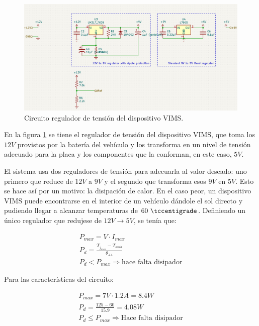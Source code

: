 \begin{figure}[H]
  \centering
  \includegraphics[width=\linewidth]{images/12vregulator.png}
  \caption{Circuito regulador de tensión del dispositivo \ac{VIMS}.}
  \label{fig:12v-regulator}
\end{figure}

En la figura \ref{fig:12v-regulator} se tiene el regulador de tensión del dispositivo
\ac{VIMS}, que toma los $12V$ provistos por la batería del vehículo y los transforma
en un nivel de tensión adecuado para la placa y los componentes que la conforman, en
este caso, $5V$.

El sistema usa dos reguladores de tensión para adecuarla al valor deseado: uno primero
que reduce de $12V$ a $9V$ y el segundo que transforma esos $9V$ en $5V$. Esto se hace
así por un motivo: la disipación de calor. En el caso peor, un dispositivo \ac{VIMS}
puede encontrarse en el interior de un vehículo dándole el sol directo y pudiendo
llegar a alcanzar temperaturas de $60~\tccentigrade$. Definiendo un único regulador
que redujese de $12V \rightarrow 5V$, se tenía que:

\begin{gather*}
  P_{max} = V \cdot I_{max} \\
  P_d = \frac{T_{j_{max}} - T_{amb}}{\theta_{JA}} \\[1ex]
  P_d < P_{max} \Longrightarrow \text{hace falta disipador}
\end{gather*}

Para las características del circuito:

\begin{gather*}
  P_{max} = 7V \cdot 1.2A = 8.4W \\
  P_d = \frac{125 - 60}{15.9} = 4.08W \\
  P_d \le P_{max} \Longrightarrow \text{Hace falta disipador}
\end{gather*}

